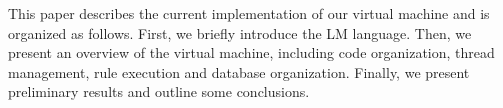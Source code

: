 This paper describes the current implementation of
our virtual machine and is organized as follows. First, we
briefly introduce the LM language. Then, we present an overview of the virtual machine, including code organization,
thread management, rule execution and database organization. Finally, we present preliminary results and
outline some conclusions.